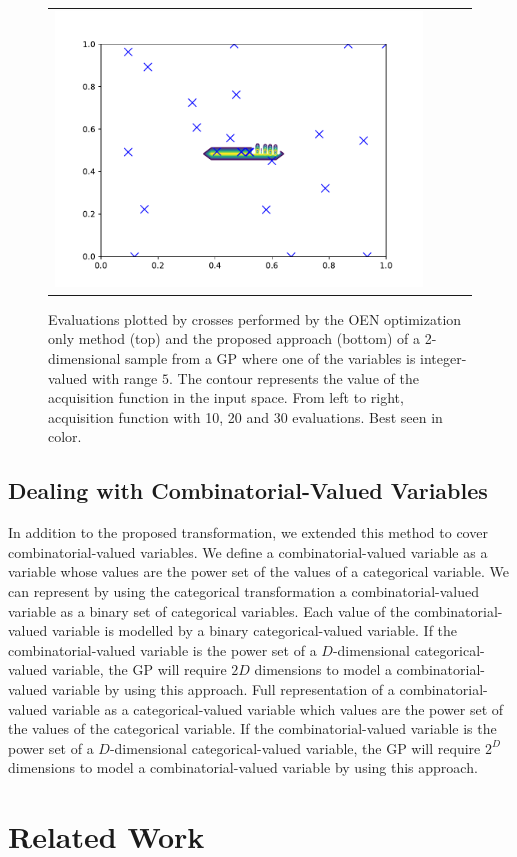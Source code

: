 \begin{figure}[htb]
\begin{center}
\begin{tabular}{lccc}
        \includegraphics[width=0.3\linewidth]{Figures/integer/toy/proposed_3.pdf} \\
\end{tabular}
\end{center}
\caption{{\small Evaluations plotted by crosses performed by the OEN optimization only
method (top) and the proposed approach (bottom) of a 2-dimensional sample from a GP where
one of the variables is integer-valued with range $5$. The contour represents the value of the
acquisition function in the input space. From left to right, acquisition function with 10, 20 and
30 evaluations. Best seen in color.}}
\label{fig:comparison}
\end{figure}


\subsection{Dealing with Combinatorial-Valued Variables}
In addition to the proposed transformation, we extended this method to cover combinatorial-valued variables. We define a combinatorial-valued variable as a variable whose values are the power set of the values of a categorical variable. We can represent by using the categorical transformation a combinatorial-valued variable as a binary set of categorical variables. Each value of the combinatorial-valued variable is modelled by a binary categorical-valued variable. If the combinatorial-valued variable is the power set of a $D$-dimensional categorical-valued variable, the GP will require $2D$ dimensions to model a combinatorial-valued variable by using this approach.
Full representation of a combinatorial-valued variable as a categorical-valued variable which values are the power set of the values of the categorical variable. If the combinatorial-valued variable is the power set of a $D$-dimensional categorical-valued variable, the GP will require $2^D$ dimensions to model a combinatorial-valued variable by using this approach.

\section{Related Work}

